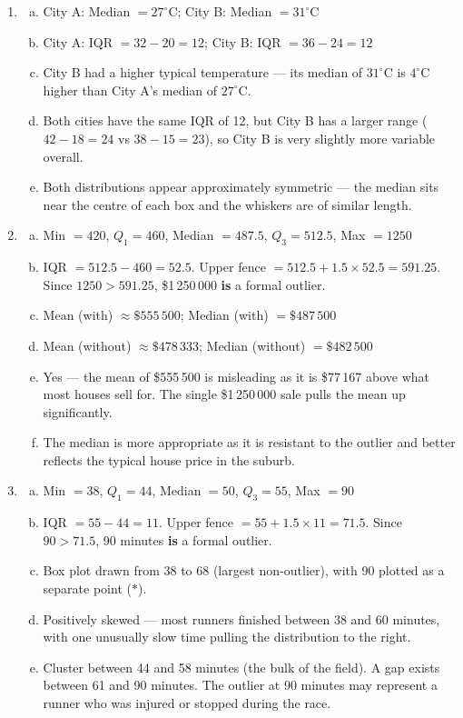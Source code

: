\documentclass{article}
\begin{document}
\begin{enumerate}
  \item
  \begin{enumerate}[(a)]
    \item City A: Median $= 27^\circ$C; City B: Median $= 31^\circ$C
    \item City A: IQR $= 32 - 20 = 12$; City B: IQR $= 36 - 24 = 12$
    \item City B had a higher typical temperature --- its median of $31^\circ$C is $4^\circ$C
    higher than City A's median of $27^\circ$C.
    \item Both cities have the same IQR of 12, but City B has a larger range ($42 - 18 = 24$
    vs $38 - 15 = 23$), so City B is very slightly more variable overall.
    \item Both distributions appear approximately symmetric --- the median sits near the centre
    of each box and the whiskers are of similar length.
  \end{enumerate}

  \item
  \begin{enumerate}[(a)]
    \item Min $= 420$, $Q_1 = 460$, Median $= 487.5$, $Q_3 = 512.5$, Max $= 1250$
    \item IQR $= 512.5 - 460 = 52.5$. Upper fence $= 512.5 + 1.5 \times 52.5 = 591.25$.
    Since $1250 > 591.25$, \$1\,250\,000 \textbf{is} a formal outlier.
    \item Mean (with) $\approx \$555\,500$; Median (with) $= \$487\,500$
    \item Mean (without) $\approx \$478\,333$; Median (without) $= \$482\,500$
    \item Yes --- the mean of \$555\,500 is misleading as it is \$77\,167 above what most
    houses sell for. The single \$1\,250\,000 sale pulls the mean up significantly.
    \item The median is more appropriate as it is resistant to the outlier and better reflects
    the typical house price in the suburb.
  \end{enumerate}

  \item
  \begin{enumerate}[(a)]
    \item Min $= 38$, $Q_1 = 44$, Median $= 50$, $Q_3 = 55$, Max $= 90$
    \item IQR $= 55 - 44 = 11$. Upper fence $= 55 + 1.5 \times 11 = 71.5$. Since $90 > 71.5$,
    90 minutes \textbf{is} a formal outlier.
    \item Box plot drawn from 38 to 68 (largest non-outlier), with 90 plotted as a separate
    point ($\ast$).
    \item Positively skewed --- most runners finished between 38 and 60 minutes, with one
    unusually slow time pulling the distribution to the right.
    \item Cluster between 44 and 58 minutes (the bulk of the field). A gap exists between 61
    and 90 minutes. The outlier at 90 minutes may represent a runner who was injured or stopped
    during the race.
  \end{enumerate}


\end{enumerate}
\end{document}
